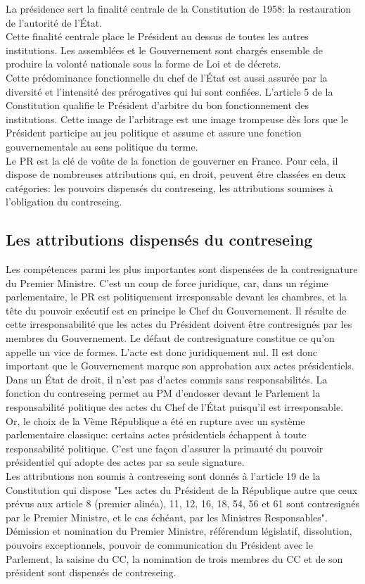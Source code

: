 \documentclass[12pt, a4paper, openany]{book}
\begin{document}
La présidence sert la finalité centrale de la Constitution de 1958: la restauration de l'autorité de l'État. \\
Cette finalité centrale place le Président au dessus de toutes les autres institutions. Les assemblées et le Gouvernement sont chargés ensemble de produire la volonté nationale sous la forme de Loi et de décrets. \\
Cette prédominance fonctionnelle du chef de l'État est aussi assurée par la diversité et l'intensité des prérogatives qui lui sont confiées. L'article 5 de la Constitution qualifie le Président d'arbitre du bon fonctionnement des institutions. Cette image de l'arbitrage est une image trompeuse dès lors que le Président participe au jeu politique et assume et assure une fonction gouvernementale au sens politique du terme. \\
Le PR est la clé de voûte de la fonction de gouverner en France. Pour cela, il dispose de nombreuses attributions qui, en droit, peuvent être classées en deux catégories: les pouvoirs dispensés du contreseing, les attributions soumises à l'obligation du contreseing.

\subsection{Les attributions dispensés du contreseing}

Les compétences parmi les plus importantes sont dispensées de la contresignature du Premier Ministre. C'est un coup de force juridique, car, dans un régime parlementaire, le PR est politiquement irresponsable devant les chambres, et la tête du pouvoir exécutif est en principe le Chef du Gouvernement. Il résulte de cette irresponsabilité que les actes du Président doivent être contresignés par les membres du Gouvernement. Le défaut de contresignature constitue ce qu'on appelle un vice de formes. L'acte est donc juridiquement nul. Il est donc important que le Gouvernement marque son approbation aux actes présidentiels. Dans un État de droit, il n'est pas d'actes commis sans responsabilités. La fonction du contreseing permet au PM d'endosser devant le Parlement la responsabilité politique des actes du Chef de  l'État puisqu'il est irresponsable. \\
Or, le choix de la Vème République a été en rupture avec un système parlementaire classique: certains actes présidentiels échappent à toute responsabilité politique. C'est une façon d'assurer la primauté du pouvoir présidentiel qui adopte des actes par sa seule signature. \\
Les attributions non soumis à contreseing sont donnés à l'article 19 de la Constitution qui dispose "Les actes du Président de la République autre que ceux prévus aux article 8 (premier alinéa), 11, 12, 16, 18, 54, 56 et 61 sont contresignés par le Premier Ministre, et le cas échéant, par les Ministres Responsables". \\ 
Démission et nomination du Premier Ministre, référendum législatif, dissolution, pouvoirs exceptionnels, pouvoir de communication du Président avec le Parlement, la saisine du CC, la nomination de trois membres du CC et de son président sont dispensés de contreseing. 
\end{document}
